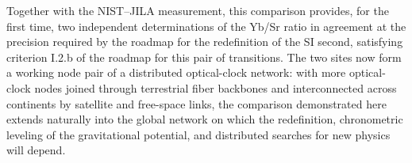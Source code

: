 Together with the NIST--JILA
measurement, this comparison provides, for the first time, two
independent
determinations of the Yb/Sr ratio in agreement at the precision
required by the roadmap for the redefinition of the SI second,
satisfying criterion I.2.b of the roadmap for this pair of
transitions. The two sites now
form a working node pair of a distributed optical-clock network: with
more optical-clock nodes joined through terrestrial fiber backbones
and interconnected across continents by satellite and free-space
links, the comparison demonstrated here extends naturally into the
global network on which the redefinition, chronometric leveling of
the gravitational potential, and distributed searches for new physics
will depend.
